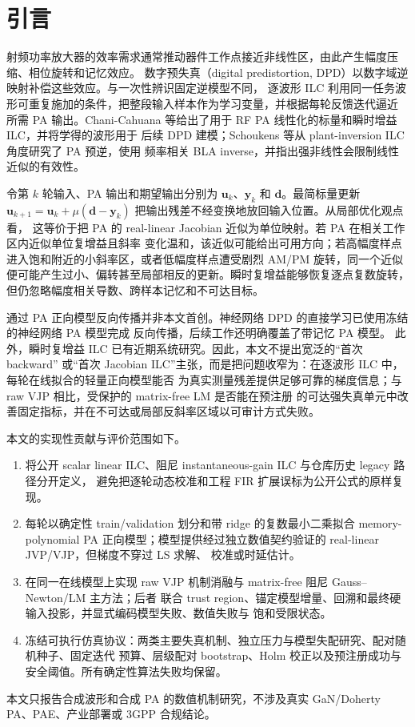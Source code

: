 \documentclass[UTF8,zihao=-4,a4paper]{ctexart}
\begin{document}
\section{引言}

射频功率放大器的效率需求通常推动器件工作点接近非线性区，由此产生幅度压缩、相位旋转和记忆效应。
数字预失真（digital predistortion, DPD）以数字域逆映射补偿这些效应。与一次性辨识固定逆模型不同，
逐波形 ILC 利用同一任务波形可重复施加的条件，把整段输入样本作为学习变量，并根据每轮反馈迭代逼近
所需 PA 输出。Chani-Cahuana 等给出了用于 RF PA 线性化的标量和瞬时增益 ILC，并将学得的波形用于
后续 DPD 建模\citep{chani2016ilc}；Schoukens 等从 plant-inversion ILC 角度研究了 PA 预逆，使用
频率相关 BLA inverse，并指出强非线性会限制线性近似的有效性\citep{schoukens2017preinverse}。

令第 $k$ 轮输入、PA 输出和期望输出分别为 $\bm u_k$、$\bm y_k$ 和 $\bm d$。最简标量更新
$\bm u_{k+1}=\bm u_k+\mu(\bm d-\bm y_k)$ 把输出残差不经变换地放回输入位置。从局部优化观点看，
这等价于把 PA 的 real-linear Jacobian 近似为单位映射。若 PA 在相关工作区内近似单位复增益且斜率
变化温和，该近似可能给出可用方向；若高幅度样点进入饱和附近的小斜率区，或者低幅度样点遭受剧烈
AM/PM 旋转，同一个近似便可能产生过小、偏转甚至局部相反的更新。瞬时复增益能够恢复逐点复数旋转，
但仍忽略幅度相关导数、跨样本记忆和不可达目标。

通过 PA 正向模型反向传播并非本文首创。神经网络 DPD 的直接学习已使用冻结的神经网络 PA 模型完成
反向传播\citep{tarver2019backprop}，后续工作还明确覆盖了带记忆 PA 模型\citep{loebl2023memorybackprop}。
此外，瞬时复增益 ILC 已有近期系统研究\citep{wei2026icg}。因此，本文不提出宽泛的“首次 backward”
或“首次 Jacobian ILC”主张，而是把问题收窄为：在逐波形 ILC 中，每轮在线拟合的轻量正向模型能否
为真实测量残差提供足够可靠的梯度信息；与 raw VJP 相比，受保护的 matrix-free LM 是否能在预注册
的可达强失真单元中改善固定指标，并在不可达或局部反斜率区域以可审计方式失败。

本文的实现性贡献与评价范围如下。
\begin{enumerate}
  \item 将公开 scalar linear ILC、阻尼 instantaneous-gain ILC 与仓库历史 legacy 路径分开定义，
        避免把逐轮动态校准和工程 FIR 扩展误标为公开公式的原样复现。
  \item 每轮以确定性 train/validation 划分和带 ridge 的复数最小二乘拟合 memory-polynomial PA
        正向模型；模型提供经过独立数值契约验证的 real-linear JVP/VJP，但梯度不穿过 LS 求解、
        校准或时延估计。
  \item 在同一在线模型上实现 raw VJP 机制消融与 matrix-free 阻尼 Gauss--Newton/LM 主方法；后者
        联合 trust region、锚定模型增量、回溯和最终硬输入投影，并显式编码模型失败、数值失败与
        饱和受限状态。
  \item 冻结可执行仿真协议：两类主要失真机制、独立压力与模型失配研究、配对随机种子、固定迭代
        预算、层级配对 bootstrap、Holm 校正以及预注册成功与安全阈值。所有确定性算法失败均保留。
\end{enumerate}
本文只报告合成波形和合成 PA 的数值机制研究，不涉及真实 GaN/Doherty PA、PAE、产业部署或
3GPP 合规结论。
\end{document}
